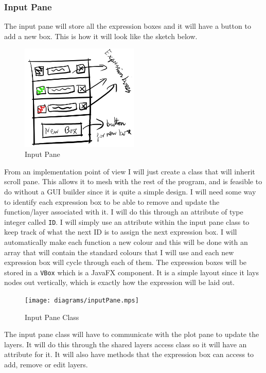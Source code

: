 \documentclass[../../../../main.tex]{subfiles}
\begin{document}
\subsubsection{Input Pane}
The input pane will store all the expression boxes and it will have a button to add a new box. This is how it will look like the sketch below.\\
\begin{figure}
	\centering
	\includegraphics[width=0.5\textwidth]{images/inputPane}
	\caption{Input Pane}
\end{figure}
From an implementation point of view I will just create a class that will inherit scroll pane. This allows it to mesh with the rest of the program, and is feasible to do without a GUI builder since it is quite a simple design. I will need some way to identify each expression box to be able to remove and update the function/layer associated with it. I will do this through an attribute of type integer called \texttt{ID}. I will simply use an attribute within the input pane class to keep track of what the next ID is to assign the next expression box. I will automatically make each function a new colour and this will be done with an array that will contain the standard colours that I will use and each new expression box will cycle through each of them. The expression boxes will be stored in a \texttt{VBox} which is a JavaFX component. It is a simple layout since it lays nodes out vertically, which is exactly how the expression will be laid out.\\
\begin{figure}[H]
	\centering
	\texttt{[image: diagrams/inputPane.mps]}
	\caption{Input Pane Class}
\end{figure}
The input pane class will have to communicate with the plot pane to update the layers. It will do this through the shared layers access class so it will have an attribute for it. It will also have methods that the expression box can access to add, remove or edit layers.
\newpage
\end{document}
